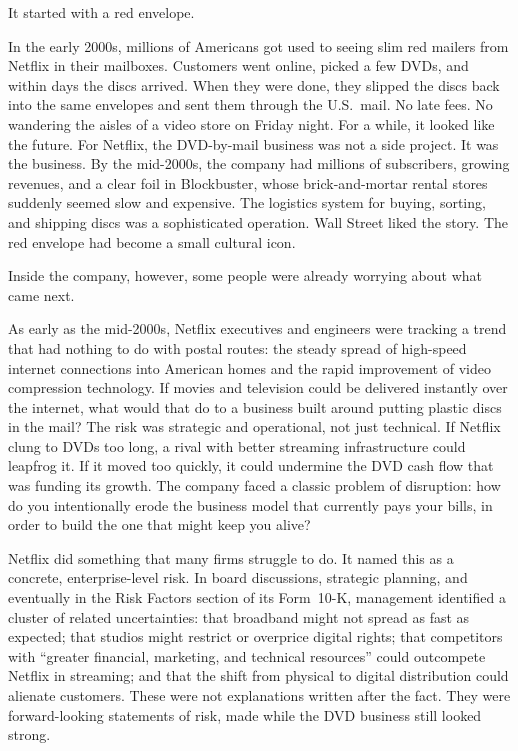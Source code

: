 \documentclass[11pt,openany]{book}
\begin{document}
\begin{corporateexample}
It started with a red envelope.
\medskip

In the early 2000s, millions of Americans got used to seeing slim red mailers from Netflix in their mailboxes. Customers went online, picked a few DVDs, and within days the discs arrived. When they were done, they slipped the discs back into the same envelopes and sent them through the U.S.\ mail. No late fees. No wandering the aisles of a video store on Friday night. For a while, it looked like the future.
\medskip
For Netflix, the DVD-by-mail business was not a side project. It was the business. By the mid-2000s, the company had millions of subscribers, growing revenues, and a clear foil in Blockbuster, whose brick-and-mortar rental stores suddenly seemed slow and expensive. The logistics system for buying, sorting, and shipping discs was a sophisticated operation. Wall Street liked the story. The red envelope had become a small cultural icon.

\medskip
Inside the company, however, some people were already worrying about what came next.

As early as the mid-2000s, Netflix executives and engineers were tracking a trend that had nothing to do with postal routes: the steady spread of high-speed internet connections into American homes and the rapid improvement of video compression technology. If movies and television could be delivered instantly over the internet, what would that do to a business built around putting plastic discs in the mail? The risk was strategic and operational, not just technical. If Netflix clung to DVDs too long, a rival with better streaming infrastructure could leapfrog it. If it moved too quickly, it could undermine the DVD cash flow that was funding its growth. The company faced a classic problem of disruption: how do you intentionally erode the business model that currently pays your bills, in order to build the one that might keep you alive?

\medskip
Netflix did something that many firms struggle to do. It named this as a concrete, enterprise-level risk. In board discussions, strategic planning, and eventually in the Risk Factors section of its Form~10-K, management identified a cluster of related uncertainties: that broadband might not spread as fast as expected; that studios might restrict or overprice digital rights; that competitors with ``greater financial, marketing, and technical resources'' could outcompete Netflix in streaming; and that the shift from physical to digital distribution could alienate customers. These were not explanations written after the fact. They were forward-looking statements of risk, made while the DVD business still looked strong.


\end{corporateexample}
\end{document}
